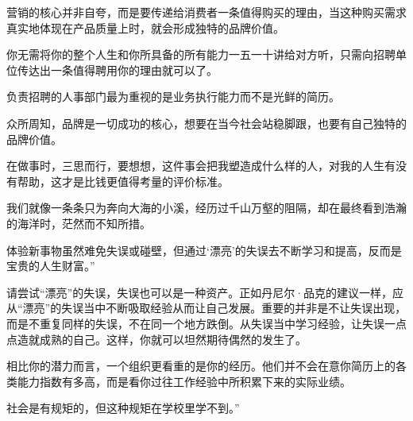 \documentclass[UTF8,a4paper,8pt]{ctexart}
\begin{document}
 
 营销的核心并非自夸，而是要传递给消费者一条值得购买的理由，当这种购买需求真实地体现在产品质量上时，就会形成独特的品牌价值。
 
 
 你无需将你的整个人生和你所具备的所有能力一五一十讲给对方听，只需向招聘单位传达出一条值得聘用你的理由就可以了。
 
 
 负责招聘的人事部门最为重视的是业务执行能力而不是光鲜的简历。
 
 
 众所周知，品牌是一切成功的核心，想要在当今社会站稳脚跟，也要有自己独特的品牌价值。
 
 
 在做事时，三思而行，要想想，这件事会把我塑造成什么样的人，对我的人生有没有帮助，这才是比钱更值得考量的评价标准。
 
 
 我们就像一条条只为奔向大海的小溪，经历过千山万壑的阻隔，却在最终看到浩瀚的海洋时，茫然而不知所措。
 
 
 体验新事物虽然难免失误或碰壁，但通过‘漂亮’的失误去不断学习和提高，反而是宝贵的人生财富。”
 
 请尝试“漂亮”的失误，失误也可以是一种资产。正如丹尼尔·品克的建议一样，应从“漂亮”的失误当中不断吸取经验从而让自己发展。重要的并非是不让失误出现，而是不重复同样的失误，不在同一个地方跌倒。从失误当中学习经验，让失误一点点造就成熟的自己。这样，你就可以坦然期待偶然的发生了。
 
 
 相比你的潜力而言，一个组织更看重的是你的经历。他们并不会在意你简历上的各类能力指数有多高，而是看你过往工作经验中所积累下来的实际业绩。
 
 
 社会是有规矩的，但这种规矩在学校里学不到。”
 \newpage
\end{document}
